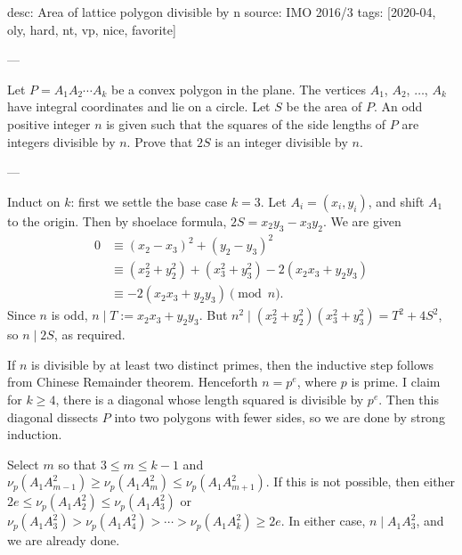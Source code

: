 desc: Area of lattice polygon divisible by n
source: IMO 2016/3
tags: [2020-04, oly, hard, nt, vp, nice, favorite]

---

Let $P=A_1A_2\cdots A_k$ be a convex polygon in the plane. The vertices $A_1$, $A_2$, $\ldots$, $A_k$ have integral coordinates and lie on a circle. Let $S$ be the area of $P$. An odd positive integer $n$ is given such that the squares of the side lengths of $P$ are integers divisible by $n$. Prove that $2S$ is an integer divisible by $n$.

---

Induct on $k$: first we settle the base case $k=3$. Let $A_i=(x_i,y_i)$, and shift $A_1$ to the origin. Then by shoelace formula, $2S=x_2y_3-x_3y_2$. We are given
\begin{align*}
    0&\equiv(x_2-x_3)^2+(y_2-y_3)^2\\
    &\equiv\left(x_2^2+y_2^2\right)+\left(x_3^2+y_3^2\right)-2(x_2x_3+y_2y_3)\\
    &\equiv-2(x_2x_3+y_2y_3)\pmod n.
\end{align*}
Since $n$ is odd, $n\mid T:=x_2x_3+y_2y_3$. But $n^2\mid\left(x_2^2+y_2^2\right)\left(x_3^2+y_3^2\right)=T^2+4S^2$, so $n\mid2S$, as required.

If $n$ is divisible by at least two distinct primes, then the inductive step follows from Chinese Remainder theorem. Henceforth $n=p^e$, where $p$ is prime. I claim for $k\ge4$, there is a diagonal whose length squared is divisible by $p^e$. Then this diagonal dissects $P$ into two polygons with fewer sides, so we are done by strong induction. 

Select $m$ so that $3\le m\le k-1$ and $\nu_p(A_1A_{m-1}^2)\ge\nu_p(A_1A_m^2)\le\nu_p(A_1A_{m+1}^2)$. If this is not possible, then either $2e\le\nu_p(A_1A_2^2)\le\nu_p(A_1A_3^2)$ or $\nu_p(A_1A_3^2)>\nu_p(A_1A_4^2)>\cdots>\nu_p(A_1A_k^2)\ge2e$. In either case, $n\mid A_1A_3^2$, and we are already done.

